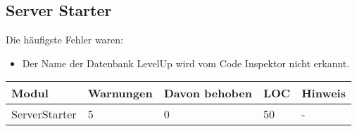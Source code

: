 \documentclass[qualitaetssicherung.tex]{subfiles}
\begin{document}
			
\subsection{Server Starter}
			Die häufigste Fehler waren:
			\begin{itemize}
				\item Der Name der Datenbank LevelUp wird vom Code Inspektor nicht erkannt.
			\end{itemize}
			\begin{center}
					\begin{tabular}{| l | l | l | l | l |}
					\hline
					Modul & Warnungen & Davon behoben & LOC & Hinweis\\ \hline
					ServerStarter & 5 & 0 & 50 & - \\ \hline
					\hline
					\end{tabular}
			\end{center}
\end{document}

